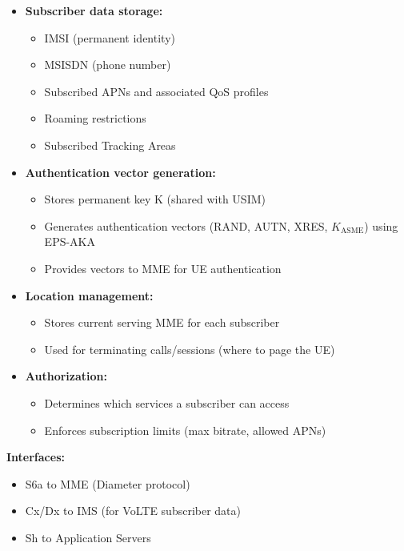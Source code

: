\begin{itemize}
\tightlist
\item
  \textbf{Subscriber data storage:}

  \begin{itemize}
  \tightlist
  \item
    IMSI (permanent identity)
  \item
    MSISDN (phone number)
  \item
    Subscribed APNs and associated QoS profiles
  \item
    Roaming restrictions
  \item
    Subscribed Tracking Areas
  \end{itemize}
\item
  \textbf{Authentication vector generation:}

  \begin{itemize}
  \tightlist
  \item
    Stores permanent key K (shared with USIM)
  \item
    Generates authentication vectors (RAND, AUTN, XRES, \ensuremath{K_{\mathrm{ASME}}}) using EPS-AKA
  \item
    Provides vectors to MME for UE authentication
  \end{itemize}
\item
  \textbf{Location management:}

  \begin{itemize}
  \tightlist
  \item
    Stores current serving MME for each subscriber
  \item
    Used for terminating calls/\allowbreak{}sessions (where to page the UE)
  \end{itemize}
\item
  \textbf{Authorization:}

  \begin{itemize}
  \tightlist
  \item
    Determines which services a subscriber can access
  \item
    Enforces subscription limits (max bitrate, allowed APNs)
  \end{itemize}
\end{itemize}

\textbf{Interfaces:}

\begin{itemize}
\tightlist
\item
  S6a to MME (Diameter protocol)
\item
  Cx/\allowbreak{}Dx to IMS (for VoLTE subscriber data)
\item
  Sh to Application Servers
\end{itemize}


